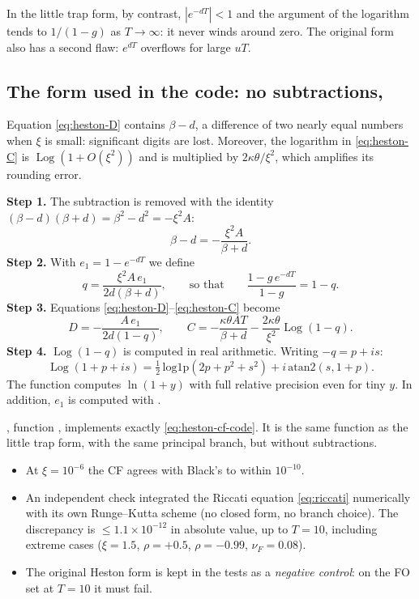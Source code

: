 In the little trap form, by contrast, $|e^{-dT}|<1$ and the argument of the logarithm tends to $1/(1-g)$ as
$T\to\infty$: it never winds around zero. The original form also has a second flaw: $e^{dT}$ overflows for large
$uT$.

\subsection{The form used in the code: no subtractions, }
Equation \eqref{eq:heston-D} contains $\beta-d$, a difference of two nearly equal numbers when $\xi$ is small:
significant digits are lost. Moreover, the logarithm in \eqref{eq:heston-C} is $\operatorname{Log}(1+O(\xi^2))$ and is
multiplied by $2\kappa\theta/\xi^2$, which amplifies its rounding error.

\textbf{Step 1.} The subtraction is removed with the identity $(\beta-d)(\beta+d)=\beta^2-d^2=-\xi^2A$:
\[
\beta-d=-\frac{\xi^2A}{\beta+d}.
\]
\textbf{Step 2.} With $e_1=1-e^{-dT}$ we define
\[
q=\frac{\xi^2A\,e_1}{2d(\beta+d)},\qquad\text{so that}\qquad \frac{1-g\,e^{-dT}}{1-g}=1-q .
\]
\textbf{Step 3.} Equations \eqref{eq:heston-D}--\eqref{eq:heston-C} become
\begin{equation}\label{eq:heston-cf-code}
D=-\frac{A\,e_1}{2d(1-q)},\qquad
C=-\frac{\kappa\theta AT}{\beta+d}-\frac{2\kappa\theta}{\xi^2}\operatorname{Log}(1-q).
\end{equation}
\textbf{Step 4.} $\operatorname{Log}(1-q)$ is computed in real arithmetic. Writing $-q=p+is$:
\[
\operatorname{Log}(1+p+is)=\tfrac12\,\mathrm{log1p}(2p+p^2+s^2)+i\,\mathrm{atan2}(s,1+p).
\]
The function  computes $\ln(1+y)$ with full relative precision even for tiny $y$. In addition, $e_1$ is
computed with .

\begin{progetto}
, function , implements exactly \eqref{eq:heston-cf-code}. It is the same
function as the little trap form, with the same principal branch, but without subtractions.
\begin{itemize}
\item At $\xi=10^{-6}$ the CF agrees with Black's to within $10^{-10}$.
\item An independent check integrated the Riccati equation \eqref{eq:riccati} numerically with its own Runge--Kutta
scheme (no closed form, no branch choice). The discrepancy is $\le{1.1\times10^{-12}}$ in absolute value, up to $T=10$,
including extreme cases ($\xi=1.5$, $\rho=+0.5$, $\rho=-0.99$, $\nu_F=0.08$).
\item The original Heston form is kept in the tests as a \emph{negative control}: on the FO set at $T=10$ it must fail.
\end{itemize}
\end{progetto}

